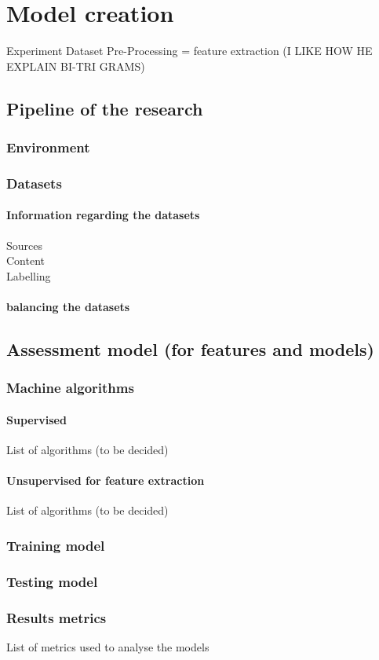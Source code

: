 
\chapter{Model creation} %

\label{Model creation}
Experiment Dataset Pre-Processing = feature extraction (I LIKE HOW HE EXPLAIN BI-TRI GRAMS)
\section{Pipeline of the research}
\subsection{Environment}
\subsection{Datasets}
\subsubsection{Information regarding the datasets}
Sources\\
Content\\
Labelling\\
\subsubsection{balancing the datasets}
\section{Assessment model (for features and models)}
\subsection{Machine algorithms}
\subsubsection{Supervised}
List of algorithms (to be decided)
\subsubsection{Unsupervised for feature extraction}
List of algorithms (to be decided)
\subsection{Training model}
\subsection{Testing model}
\subsection{Results metrics}
List of metrics used to analyse the models 
